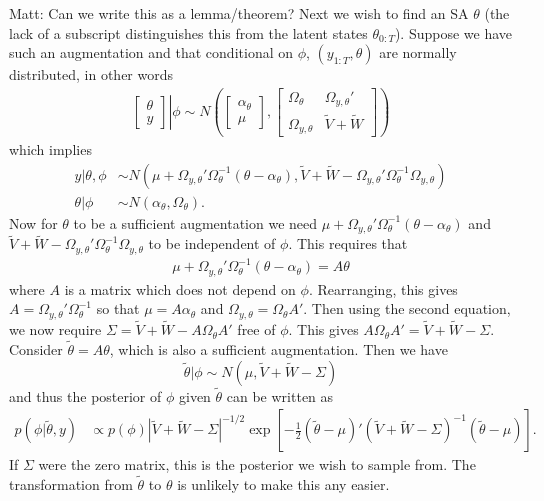 \documentclass{article}
\newcommand{\matt}[1]{{\color{red} Matt: #1}}
\begin{document}
\matt{Can we write this as a lemma/theorem?}
Next we wish to find an SA $\theta$ (the lack of a subscript distinguishes this from the latent states $\theta_{0:T}$). Suppose we have such an augmentation and that conditional on $\phi$, $(y_{1:T},\theta)$ are normally distributed, in other words
\begin{align*}
 \left. \begin{bmatrix}\theta \\ y \end{bmatrix}\right|\phi \sim N\left(\begin{bmatrix} \alpha_\theta \\ \mu \end{bmatrix}, \begin{bmatrix} 
   \Omega_\theta & \Omega_{y,\theta}' \\
   \Omega_{y,\theta} & \tilde{V} + \tilde{W} \end{bmatrix}\right)
\end{align*}
which implies
\begin{align*}
  y|\theta,\phi &\sim N(\mu + \Omega_{y,\theta}'\Omega_\theta^{-1}(\theta - \alpha_\theta), \tilde{V} + \tilde{W} - \Omega_{y,\theta}'\Omega_{\theta}^{-1}\Omega_{y,\theta})\\
  \theta|\phi &\sim N(\alpha_\theta, \Omega_\theta).
\end{align*}
Now for $\theta$ to be a sufficient augmentation we need $\mu + \Omega_{y,\theta}'\Omega_\theta^{-1}(\theta - \alpha_\theta)$ and $\tilde{V} + \tilde{W} - \Omega_{y,\theta}'\Omega_{\theta}^{-1}\Omega_{y,\theta}$
to be independent of $\phi$. This requires that
\begin{align*}
  \mu + \Omega_{y,\theta}'\Omega_\theta^{-1}(\theta - \alpha_\theta) = A\theta
\end{align*}
where $A$ is a matrix which does not depend on $\phi$. Rearranging, this gives $A=\Omega_{y,\theta}'\Omega_{\theta}^{-1}$ so that $\mu = A\alpha_\theta$ and $\Omega_{y,\theta} = \Omega_{\theta}A'$. Then using the second equation, we now require $\Sigma = \tilde{V} + \tilde{W} - A\Omega_{\theta}A'$ free of $\phi$. This gives $A\Omega_{\theta}A' = \tilde{V} + \tilde{W} - \Sigma$. Consider $\tilde{\theta}=A\theta$, which is also a sufficient augmentation. Then we have
\[
\tilde{\theta}|\phi \sim N(\mu, \tilde{V} + \tilde{W} - \Sigma)
\]
and thus the posterior of $\phi$ given $\tilde{\theta}$ can be written as
\begin{align*}
  p(\phi|\tilde{\theta}, y) &\propto p(\phi)|\tilde{V} + \tilde{W} - \Sigma|^{-1/2}\exp\left[-\frac{1}{2}(\tilde{\theta} - \mu)'(\tilde{V} + \tilde{W} - \Sigma)^{-1}(\tilde{\theta} - \mu)\right].
\end{align*}
If $\Sigma$ were the zero matrix, this is the posterior we wish to sample from. The transformation from $\tilde{\theta}$ to $\theta$ is unlikely to make this any easier. 
\end{document}
